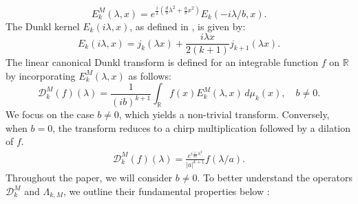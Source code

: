 \documentclass[12pt,a4paper,reqno]{amsproc}
\theoremstyle{definition}
\theoremstyle{remark}
\numberwithin{equation}{section}
\begin{document}
\begin{equation*}
E^M_{k}(\lambda,x) = e^{\frac{i}{2}(\frac{d}{b}\lambda^2+\frac{a}{b}x^2)}E_{k}(-i\lambda/b,x).
\end{equation*} 
The Dunkl kernel $E_k(i\lambda, x)$, as defined in \cite{soltani2004lp}, is given by:
 \begin{equation*}
E_k(i\lambda,x) = j_{k}(\lambda x)+\frac{i\lambda x}{2(k+1)}j_{k+1}(\lambda x).
\end{equation*}
The linear canonical Dunkl transform is defined for an integrable function
$f$ on $\mathbb{R}$ by incorporating $E^M_{k}(\lambda,x)$ \cite{ghazouani2017unified} as follows:
\begin{equation*}
\mathcal{D}_k^M(f)(\lambda) = \frac{1}{(ib)^{k+1}} \int_{\mathbb{R}}f(x)E^M_{k}(\lambda,x)\,d\mu_{k}(x),  \quad b \neq 0.
\end{equation*}
We focus on the case
$b\neq 0$, which yields a non-trivial transform. Conversely, when 
$b=0$, the transform reduces to a chirp multiplication followed by a dilation of 
$f$.
\begin{eqnarray*}
\mathcal{D}^M_{k}(f)(\lambda) = \frac{e^{i\frac{c}{2a}\lambda^2}}{|a|^{k +1}}f(\lambda/a).
\end{eqnarray*}
Throughout the paper, we will consider $b\neq 0$.
To better understand the operators $\mathcal{D}^M_{k}$ and $\Lambda_{k,M}$,  we outline their fundamental properties below \cite{ghazouani2017unified, USK}:
\end{document}
